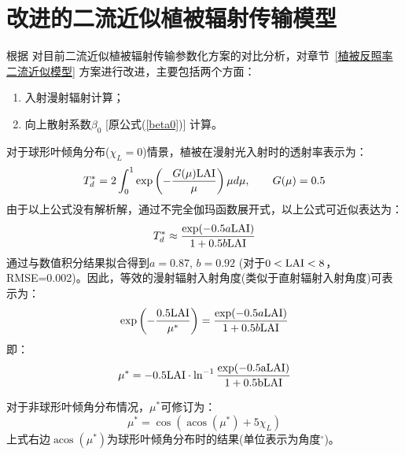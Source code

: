 \section{改进的二流近似植被辐射传输模型}\label{sec:改进的二流近似植被辐射传输模型}
根据 \citet{yuan2017reexamination} 对目前二流近似植被辐射传输参数化方案的对比分析，对章节~\ref{植被反照率二流近似模型} 方案进行改进，主要包括两个方面：
\begin{enumerate}
    \item 入射漫射辐射计算；
    \item 向上散射系数$\beta_0$ [原公式(\ref{beta0})] 计算。
\end{enumerate}

对于球形叶倾角分布($\chi_L=0$)情景，植被在漫射光入射时的透射率表示为：
\begin{equation}
T_{d}^{*}=2 \int_{0}^{1} \exp \left(-\frac{G(\mu) \rm LAI}{\mu}\right) \mu d \mu, \qquad G(\mu)=0.5
\end{equation}
由于以上公式没有解析解，通过不完全伽玛函数展开式，以上公式可近似表达为：
\begin{equation}
T_{d}^{*} \approx \frac{\exp (-0.5 a \rm LAI)}{1+0.5 b \rm LAI}
\end{equation}
通过与数值积分结果拟合得到$a=0.87$, $b=0.92$ (对于$0<\rm LAI<8$，RMSE=0.002)。因此，等效的漫射辐射入射角度(类似于直射辐射入射角度)可表示为：
\begin{equation}
\exp \left(-\frac{0.5 \rm LAI}{\mu^{*}}\right)=\frac{\exp (-0.5 a \rm LAI)}{1+0.5 b \rm LAI}
\end{equation}
即：
\begin{equation}
\mu^{*}=-0.5 \rm LAI \cdot \ln ^{-1} \frac{\exp (-0.5 a \rm LAI)}{1+0.5 b \rm LAI}
\end{equation}

对于非球形叶倾角分布情况，$\mu^\ast$可修订为：
\begin{equation}
\mu^{*}=\cos \left(\operatorname{acos}\left(\mu^{*}\right)+5 \chi_{L}\right)
\end{equation}
上式右边$\operatorname{acos}\left(\mu^{*}\right)$为球形叶倾角分布时的结果(单位表示为角度$^{\circ}$)。


